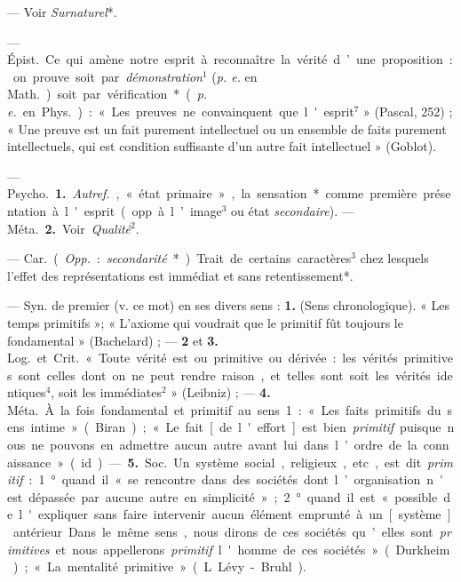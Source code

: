 \begin{itemize}[leftmargin=1cm, label=, itemsep=1pt]
 — Voir {\it Surnaturel}*.

 — \si{Épist.} Ce qui amène notre esprit à reconnaître la vérité
d’une proposition : on prouve soit par {\it démonstration}$^1$ ({\it p. e.}
en \si{Math.}) soit par vérification* ({\it p. e.} en \si{Phys.}) : « Les
preuves ne convainquent que l'esprit$^7$ » (Pascal, 252) ; « Une preuve est
un fait purement intellectuel ou un ensemble de faits purement
intellectuels, qui est condition suffisante d’un autre fait intellectuel
» (Goblot).

 — \si{Psycho.} {\bf 1.} {\it Autref.}, « état primaire », la
sensation* comme première présentation à l'esprit (opp. à l’image$^3$ ou
état {\it secondaire}). — \si{Méta.} {\bf 2.} Voir {\it Qualité}$^2$.

 — \si{Car.} ({\it Opp.} : {\it secondarité}*). Trait de
certains caractères$^3$ chez lesquels l'effet des représentations est
immédiat et sans retentissement*.

 — Syn. de premier (v. ce mot) en ses divers sens : {\bf 1.}
(Sens chronologique). « Les temps primitifs »; « L’axiome qui voudrait que
le primitif fût toujours le fondamental » (Bachelard) ; — {\bf 2} et
{\bf 3.} \si{Log.} et \si{Crit.} « Toute vérité est ou primitive ou
dérivée : les vérités primitives sont celles dont on ne peut rendre raison,
et telles sont soit les vérités identiques$^4$, soit les immédiates$^2$
» (Leibniz) ; — {\bf 4.} \si{Méta.} À la fois fondamental et primitif au
sens 1 : « Les faits primitifs du sens intime » (Biran) ; « Le fait [de
l'effort] est bien {\it primitif} puisque nous ne pouvons en admettre aucun
autre avant lui dans l’ordre de la connaissance » (id.).

— {\bf 5.} \si{Soc.} Un système social, religieux, etc, est dit
{\it primitif} : 1° quand il « se rencontre dans des sociétés dont
l’organisation n'est dépassée par aucune autre en simplicité » ; 2° quand il
est « possible de l'expliquer sans faire intervenir aucun élément emprunté à
un [système] antérieur. Dans le même sens, nous dirons de ces sociétés
qu’elles sont {\it primitives} et nous appellerons {\it primitif} l'homme de
ces sociétés » (Durkheim) ; « La mentalité primitive » (L. Lévy-Bruhl).


\end{itemize}
